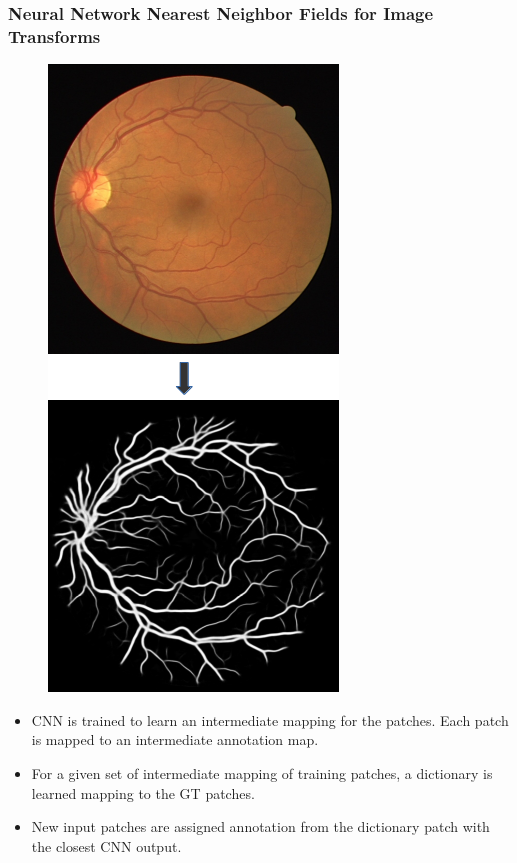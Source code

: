 \documentclass{beamer}
\begin{document}
	

	

	

	
	\begin{frame}
		\frametitle{Neural Network Nearest Neighbor Fields for Image Transforms}

			\begin{figure}
				\includegraphics[width=0.6\linewidth]{Images/N4.png}
			\end{figure}
			

			\begin{itemize}
				\item CNN is trained to learn an intermediate mapping for the patches. Each patch is mapped to an intermediate annotation map.
				\item For a given set of intermediate mapping of training patches, a dictionary is learned mapping to the GT patches.
				\item New input patches are assigned annotation from the dictionary patch with the closest CNN output.
			\end{itemize}					
	
	\end{frame}
\end{document}
